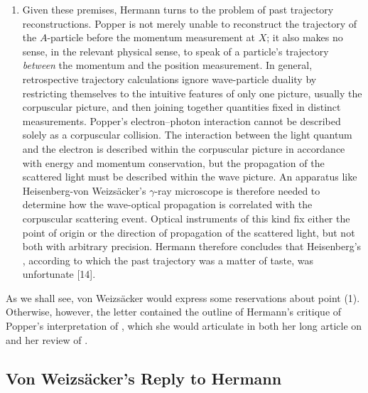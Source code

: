 \documentclass[pdflatex]{sn-jnl}
\newcommand{\LdF}{\bt{Logik der Forschung}\xspace}
\newcommand{\vW}{von Weizsäcker\xspace}
\newcommand{\VW}{Von Weizsäcker\xspace}
\begin{document}
\begin{enumerate}
\item Given these premises, Hermann turns to the problem of past trajectory reconstructions. Popper is not merely unable to reconstruct the trajectory of the $A$-particle before the momentum measurement at $X$; it also makes no sense, in the relevant physical sense, to speak of a particle's trajectory \emph{between} the momentum and the position measurement. In general, retrospective trajectory calculations ignore wave-particle duality by restricting themselves to the intuitive features of only one picture, usually the corpuscular picture, and then joining together quantities fixed in distinct measurements. Popper's electron--photon interaction cannot be described solely as a corpuscular collision. The interaction between the light quantum and the electron is described within the corpuscular picture in accordance with energy and momentum conservation, but the propagation of the scattered light must be described within the wave picture. An apparatus like Heisenberg-\vW's $\gamma$-ray microscope is therefore needed to determine how the wave-optical propagation is correlated with the corpuscular scattering event. Optical instruments of this kind fix either the point of origin or the direction of propagation of the scattered light, but not both with arbitrary precision. Hermann therefore concludes that Heisenberg’s , according to which the past trajectory was a matter of taste, was unfortunate [14].
\end{enumerate}
%
As we shall see, \vW would express some reservations about point (1). Otherwise, however, the letter contained the outline of Hermann's critique of Popper's interpretation of \qm, which she would articulate in both her long article on \qm \citep{Hermann1935} and her review of \LdF \citep{Hermann1935a}.

\subsection{\VW's Reply to Hermann}
\end{document}
